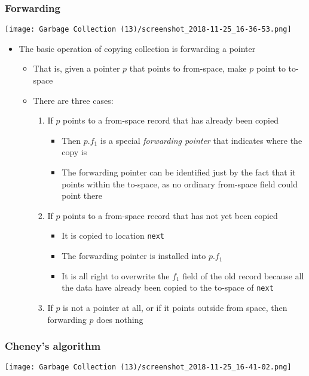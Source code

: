 \documentclass[11pt]{article}
\begin{document}
\subsubsection{Forwarding}
\label{sec:org0e68759}
\begin{center}
\texttt{[image: Garbage Collection (13)/screenshot\_2018-11-25\_16-36-53.png]}
\end{center}
\begin{itemize}
\item The basic operation of copying collection is forwarding a pointer
\begin{itemize}
\item That is, given a pointer \(p\) that points to from-space, make \(p\) point to to-space
\item There are three cases:
\begin{enumerate}
\item If \(p\) points to a from-space record that has already been copied
\begin{itemize}
\item Then \(p.f_1\) is a special \emph{forwarding pointer} that indicates where the copy is
\item The forwarding pointer can be identified just by the fact that it points within the to-space, as no ordinary from-space field could point there
\end{itemize}
\item If \(p\) points to a from-space record that has not yet been copied
\begin{itemize}
\item It is copied to location \texttt{next}
\item The forwarding pointer is installed into \(p.f_1\)
\item It is all right to overwrite the \(f_1\) field of the old record because all the data have already been copied to the to-space of \texttt{next}
\end{itemize}
\item If \(p\) is not a pointer at all, or if it points outside from space, then forwarding \(p\) does nothing
\end{enumerate}
\end{itemize}
\end{itemize}

\subsubsection{Cheney's algorithm}
\label{sec:org869e25c}
\begin{center}
\texttt{[image: Garbage Collection (13)/screenshot\_2018-11-25\_16-41-02.png]}
\end{center}
\end{document}
